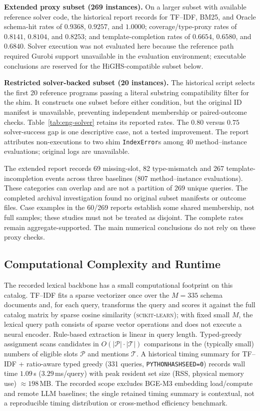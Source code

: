 \medskip\noindent\textbf{Extended proxy subset (269 instances).}
On a larger subset with available reference solver code, the historical report records for TF--IDF, BM25, and Oracle schema-hit rates of $0.9368$, $0.9257$, and $1.0000$; coverage/type-proxy rates of $0.8141$, $0.8104$, and $0.8253$; and template-completion rates of $0.6654$, $0.6580$, and $0.6840$. Solver execution was not evaluated here because the reference path required Gurobi support unavailable in the evaluation environment; executable conclusions are reserved for the HiGHS-compatible subset below.

\medskip\noindent\textbf{Restricted solver-backed subset (20 instances).}
The historical script selects the first 20 reference programs passing a literal substring compatibility filter for the shim. It constructs one subset before either condition, but the original ID manifest is unavailable, preventing independent membership or paired-outcome checks. Table~\ref{tab:eng-solver} retains its reported rates. The $0.80$ versus $0.75$ solver-success gap is one descriptive case, not a tested improvement. The report attributes non-executions to two shim \texttt{IndexError}s among 40 method--instance evaluations; original logs are unavailable.



The extended report records 69 missing-slot, 82 type-mismatch and 267 template-incompletion events across three baselines (807 method--instance evaluations). These categories can overlap and are not a partition of 269 unique queries. The completed archival investigation found no original subset manifests or outcome files. Case examples in the 60/269 reports establish some shared membership, not full samples; these studies must not be treated as disjoint. The complete rates remain aggregate-supported. The main numerical conclusions do not rely on these proxy checks.


\subsection{Computational Complexity and Runtime}
\label{app:runtime-details}\label{subsec:exp_runtime}

The recorded lexical backbone has a small computational footprint on this catalog. TF--IDF fits a sparse vectorizer once over the $M=335$ schema documents and, for each query, transforms the query and scores it against the full catalog matrix by sparse cosine similarity (\textsc{scikit-learn}); with fixed small $M$, the lexical query path consists of sparse vector operations and does not execute a neural encoder. Rule-based extraction is linear in query length. Typed-greedy assignment scans candidates in $O(|\mathcal{P}|\cdot|\mathcal{T}|)$ comparisons in the (typically small) numbers of eligible slots $\mathcal P$ and mentions $\mathcal T$. A historical timing summary for TF--IDF + ratio-aware typed greedy (331 queries, \texttt{PYTHONHASHSEED=0}) records wall time $1.09$\,s ($3.29$\,ms/query) with peak resident set size (RSS, physical memory use) $\approx 198$\,MB. The recorded scope excludes BGE-M3 embedding load/compute and remote LLM baselines; the single retained timing summary is contextual, not a reproducible timing distribution or cross-method efficiency benchmark.


